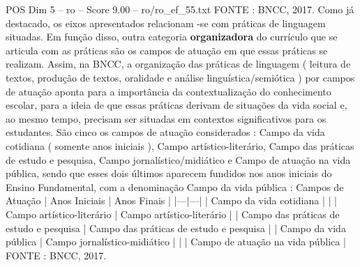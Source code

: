 \begin{textsample}{POS Dim 5 – ro – Score 9.00 – ro/ro\_ef\_55.txt}
FONTE : BNCC, 2017.
Como já destacado, os eixos apresentados relacionam -se com práticas de linguagem situadas.
Em função disso, outra categoria \textbf{organizadora} do currículo que se articula com as práticas são os campos de atuação em que essas práticas se realizam.
Assim, na BNCC, a organização das práticas de linguagem ( leitura de textos, produção de textos, oralidade e análise linguística/semiótica ) por campos de atuação aponta para a importância da contextualização do conhecimento escolar, para a ideia de que essas práticas derivam de situações da vida social e, ao mesmo tempo, precisam ser situadas em contextos significativos para os estudantes.
São cinco os campos de atuação considerados : Campo da vida cotidiana ( somente anos iniciais ), Campo artístico-literário, Campo das práticas de estudo e pesquisa, Campo jornalístico/midiático e Campo de atuação na vida pública, sendo que esses dois últimos aparecem fundidos nos anos iniciais do Ensino Fundamental, com a denominação Campo da vida pública : Campos de Atuação | Anos Iniciais | Anos Finais | |---|---| | Campo da vida cotidiana | | | Campo artístico-literário | Campo artístico-literário | | Campo das práticas de estudo e pesquisa | Campo das práticas de estudo e pesquisa | | Campo da vida pública | Campo jornalístico-midiático | | | Campo de atuação na vida pública | FONTE : BNCC, 2017.

\end{textsample}
